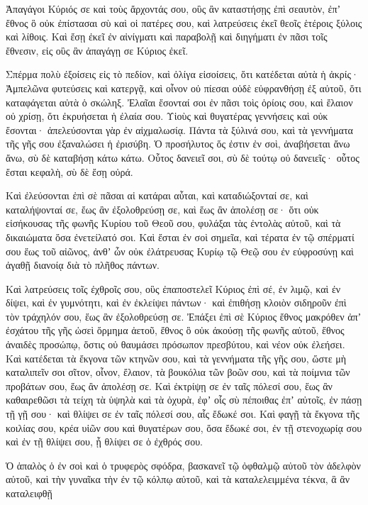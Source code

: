 {\par }{\PP {}Ἀπαγάγοι Κύριός σε καὶ τοὺς ἄρχοντάς σου, οὓς ἂν καταστήσῃς ἐπὶ σεαυτὸν, ἐπʼ ἔθνος ὃ οὐκ ἐπίστασαι σὺ καὶ οἱ πατέρες σου, καὶ λατρεύσεις ἐκεῖ θεοῖς ἑτέροις ξύλοις καὶ λίθοις.
Καὶ ἔσῃ ἐκεῖ ἐν αἰνίγματι καὶ παραβολῇ καὶ διηγήματι ἐν πᾶσι τοῖς ἔθνεσιν, εἰς οὓς ἂν ἀπαγάγῃ σε Κύριος ἐκεῖ.
\par }{\PP {}Σπέρμα πολὺ ἐξοίσεις εἰς τὸ πεδίον, καὶ ὀλίγα εἰσοίσεις, ὅτι κατέδεται αὐτὰ ἡ ἀκρίς·
Ἀμπελῶνα φυτεύσεις καὶ κατεργᾷ, καὶ οἶνον οὐ πίεσαι οὐδὲ εὐφρανθήσῃ ἐξ αὐτοῦ, ὅτι καταφάγεται αὐτὰ ὁ σκώληξ.
Ἐλαῖαι ἔσονταί σοι ἐν πᾶσι τοὶς ὁρίοις σου, καὶ ἔλαιον οὐ χρίσῃ, ὅτι ἐκρυήσεται ἡ ἐλαία σου.
Υἱοὺς καὶ θυγατέρας γεννήσεις καὶ οὐκ ἔσονται· ἀπελεύσονται γὰρ ἐν αἰχμαλωσίᾳ.
Πάντα τὰ ξύλινά σου, καὶ τὰ γεννήματα τῆς γῆς σου ἐξαναλώσει ἡ ἐρισύβη.
Ὁ προσήλυτος ὅς ἐστιν ἐν σοὶ, ἀναβήσεται ἄνω ἄνω, σὺ δὲ καταβήσῃ κάτω κάτω.
Οὗτος δανειεῖ σοι, σὺ δὲ τούτῳ οὐ δανειεῖς· οὗτος ἔσται κεφαλὴ, σὺ δὲ ἔσῃ οὐρά.
\par }{\PP {}Καὶ ἐλεύσονται ἐπὶ σὲ πᾶσαι αἱ κατάραι αὗται, καὶ καταδιώξονταί σε, καὶ καταλήψονταί σε, ἔως ἂν ἐξολοθρεύσῃ σε, καὶ ἕως ἂν ἀπολέσῃ σε· ὅτι οὐκ εἰσήκουσας τῆς φωνῆς Κυρίου τοῦ Θεοῦ σου, φυλάξαι τὰς ἐντολὰς αὐτοῦ, καὶ τὰ δικαιώματα ὅσα ἐνετείλατό σοι.
Καὶ ἔσται ἐν σοὶ σημεῖα, καὶ τέρατα ἐν τῷ σπέρματί σου ἕως τοῦ αἰῶνος,
ἀνθʼ ὧν οὐκ ἐλάτρευσας Κυρίῳ τῷ Θεῷ σου ἐν εὐφροσύνῃ καὶ ἀγαθῇ διανοίᾳ διὰ τὸ πλῆθος πάντων.
\par }{\PP {}Καὶ λατρεύσεις τοῖς ἐχθροῖς σου, οὓς ἐπαποστελεῖ Κύριος ἐπὶ σέ, ἐν λιμῷ, καὶ ἐν δίψει, καὶ ἐν γυμνότητι, καὶ ἐν ἐκλείψει πάντων· καὶ ἐπιθήσῃ κλοιὸν σιδηροῦν ἐπὶ τὸν τράχηλόν σου, ἕως ἂν ἐξολοθρεύσῃ σε.
Ἐπάξει ἐπὶ σὲ Κύριος ἔθνος μακρόθεν ἀπʼ ἐσχάτου τῆς γῆς ὡσεὶ ὅρμημα ἀετοῦ, ἔθνος ὃ οὐκ ἀκούσῃ τῆς φωνῆς αὐτοῦ,
ἔθνος ἀναιδὲς προσώπῳ, ὅστις οὐ θαυμάσει πρόσωπον πρεσβύτου, καὶ νέον οὐκ ἐλεήσει.
Καὶ κατέδεται τὰ ἔκγονα τῶν κτηνῶν σου, καὶ τὰ γεννήματα τῆς γῆς σου, ὥστε μὴ καταλιπεῖν σοι σῖτον, οἶνον, ἔλαιον, τὰ βουκόλια τῶν βοῶν σου, καὶ τὰ ποίμνια τῶν προβάτων σου, ἕως ἂν ἀπολέσῃ σε.
Καὶ ἐκτρίψῃ σε ἐν ταῖς πόλεσί σου, ἕως ἂν καθαιρεθῶσι τὰ τείχη τὰ ὑψηλὰ καὶ τὰ ὀχυρὰ, ἐφʼ οἷς σὺ πέποιθας ἐπʼ αὐτοῖς, ἐν πάσῃ τῇ γῇ σου· καὶ θλίψει σε ἐν ταῖς πόλεσί σου, αἷς ἔδωκέ σοι.
Καὶ φαγῇ τὰ ἔκγονα τῆς κοιλίας σου, κρέα υἱῶν σου καὶ θυγατέρων σου, ὅσα ἔδωκέ σοι, ἐν τῇ στενοχωρίᾳ σου καὶ ἐν τῇ θλίψει σου, ᾗ θλίψει σε ὁ ἐχθρός σου.
\par }{\PP {}Ὁ ἁπαλὸς ὁ ἐν σοὶ καὶ ὁ τρυφερὸς σφόδρα, βασκανεῖ τῷ ὀφθαλμῷ αὐτοῦ τὸν ἀδελφὸν αὐτοῦ, καὶ τὴν γυναῖκα τὴν ἐν τῷ κόλπῳ αὐτοῦ, καὶ τὰ καταλελειμμένα τέκνα, ἃ ἂν καταλειφθῇ
}
